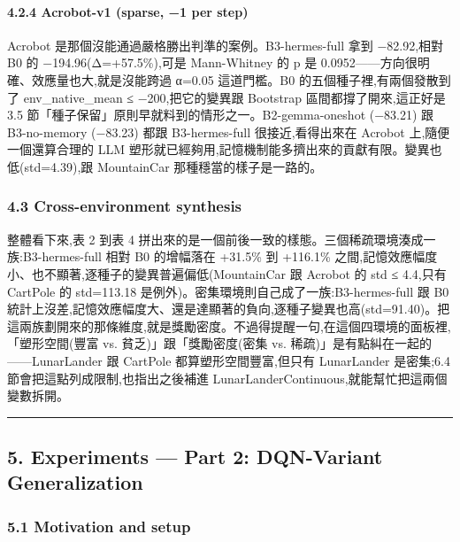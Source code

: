 \paragraph{4.2.4 Acrobot-v1 (sparse, −1 per step)}\label{424-acrobot-v1-sparse-1-per-step}

Acrobot 是那個沒能通過嚴格勝出判準的案例。B3-hermes-full 拿到 −82.92,相對 B0 的 −194.96(Δ=+57.5\%),可是 Mann-Whitney 的 p 是 0.0952------方向很明確、效應量也大,就是沒能跨過 α=0.05 這道門檻。B0 的五個種子裡,有兩個發散到了 env\_native\_mean ≤ −200,把它的變異跟 Bootstrap 區間都撐了開來,這正好是 3.5 節「種子保留」原則早就料到的情形之一。B2-gemma-oneshot (−83.21) 跟 B3-no-memory (−83.23) 都跟 B3-hermes-full 很接近,看得出來在 Acrobot 上,隨便一個還算合理的 LLM 塑形就已經夠用,記憶機制能多擠出來的貢獻有限。變異也低(std=4.39),跟 MountainCar 那種穩當的樣子是一路的。

\subsubsection{4.3 Cross-environment synthesis}\label{43-cross-environment-synthesis}

整體看下來,表 2 到表 4 拼出來的是一個前後一致的樣態。三個稀疏環境湊成一族:B3-hermes-full 相對 B0 的增幅落在 +31.5\% 到 +116.1\% 之間,記憶效應幅度小、也不顯著,逐種子的變異普遍偏低(MountainCar 跟 Acrobot 的 std ≤ 4.4,只有 CartPole 的 std=113.18 是例外)。密集環境則自己成了一族:B3-hermes-full 跟 B0 統計上沒差,記憶效應幅度大、還是達顯著的負向,逐種子變異也高(std=91.40)。把這兩族劃開來的那條維度,就是獎勵密度。不過得提醒一句,在這個四環境的面板裡,「塑形空間(豐富 vs. 貧乏)」跟「獎勵密度(密集 vs. 稀疏)」是有點糾在一起的------LunarLander 跟 CartPole 都算塑形空間豐富,但只有 LunarLander 是密集;6.4 節會把這點列成限制,也指出之後補進 LunarLanderContinuous,就能幫忙把這兩個變數拆開。

\begin{center}\rule{0.5\linewidth}{0.5pt}\end{center}

\subsection{5. Experiments --- Part 2: DQN-Variant Generalization}\label{5-experiments--part-2-dqn-variant-generalization}

\subsubsection{5.1 Motivation and setup}\label{51-motivation-and-setup}

